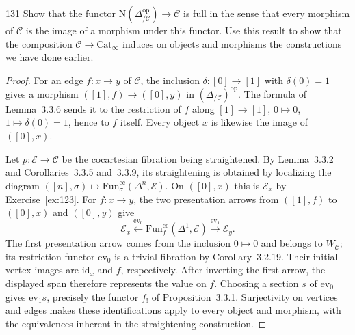 \begin{exercise}{131}
Show that the functor $\mathrm N(\Delta^{\mathrm{op}}_{/\mathcal C})\to\mathcal C$ is full in the sense that every morphism
of $\mathcal C$ is the image of a morphism under this functor. Use this result to show that the
composition $\mathcal C\to\mathrm{Cat}_\infty$ induces on objects and morphisms the constructions we have done
earlier.

\begin{proof}
For an edge $f\colon x\to y$ of $\mathcal C$, the inclusion
$\delta\colon[0]\to[1]$ with $\delta(0)=1$ gives a morphism
$([1],f)\to([0],y)$ in $(\Delta_{/\mathcal C})^{\mathrm{op}}$.
The formula of Lemma~3.3.6 sends it to the restriction of $f$ along
$[1]\to[1]$, $0\mapsto0$, $1\mapsto\delta(0)=1$, hence to $f$ itself.
Every object $x$ is likewise the image of $([0],x)$.

Let $p\colon\mathcal E\to\mathcal C$ be the cocartesian fibration being
straightened. By Lemma~3.3.2 and Corollaries~3.3.5 and~3.3.9, its
straightening is obtained by localizing the diagram
$([n],\sigma)\mapsto\mathrm{Fun}^{\mathrm{cc}}_\sigma(\Delta^n,\mathcal E)$.
On $([0],x)$ this is $\mathcal E_x$ by Exercise~\ref{ex:123}.
For $f\colon x\to y$, the two presentation arrows from $([1],f)$ to
$([0],x)$ and $([0],y)$ give
\[
 \mathcal E_x\xleftarrow{\mathrm{ev}_0}
 \mathrm{Fun}^{\mathrm{cc}}_f(\Delta^1,\mathcal E)
 \xrightarrow{\mathrm{ev}_1}\mathcal E_y.
\]
The first presentation arrow comes from the inclusion $0\mapsto0$ and
belongs to $W_{\mathcal C}$; its restriction functor $\mathrm{ev}_0$ is a
trivial fibration by Corollary~3.2.19.
Their initial-vertex images are $\mathrm{id}_x$ and $f$, respectively.
After inverting the first arrow, the displayed span therefore represents
the value on $f$. Choosing a section $s$ of $\mathrm{ev}_0$ gives
$\mathrm{ev}_1s$, precisely the functor $f_!$ of Proposition~3.3.1.
Surjectivity on vertices and edges makes these identifications apply to
every object and morphism, with the equivalences inherent in the
straightening construction.
\end{proof}
\end{exercise}
